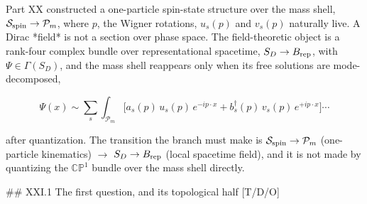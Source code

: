 Part XX constructed a one-particle spin-state structure over the mass shell, $\mathcal S_{\rm spin}\to\mathcal P_m$, where $p$, the Wigner rotations, $u_s(p)$ and $v_s(p)$ naturally live. A Dirac *field* is not a section over phase space. The field-theoretic object is a rank-four complex bundle over representational spacetime, $S_D\to B_{\rm rep}$, with $\Psi\in\Gamma(S_D)$, and the mass shell reappears only when its free solutions are mode-decomposed,

$$\Psi(x)\sim\sum_s\int_{\mathcal P_m}\big[a_s(p)\,u_s(p)\,e^{-ip\cdot x}+b_s^\dagger(p)\,v_s(p)\,e^{+ip\cdot x}\big]\cdots$$

after quantization. The transition the branch must make is $\mathcal S_{\rm spin}\to\mathcal P_m$ (one-particle kinematics) $\longrightarrow$ $S_D\to B_{\rm rep}$ (local spacetime field), and it is not made by quantizing the $\mathbb{CP}^1$ bundle over the mass shell directly.

## XXI.1 The first question, and its topological half [T/D/O]

